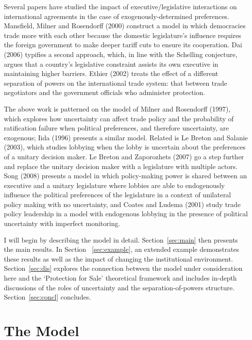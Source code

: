 \documentclass[10pt]{article}
\begin{document}
Several papers have studied the impact of executive/legislative interactions on international agreements in the case of exogenously-determined preferences. Mansfield, Milner and Rosendorff (2000) construct a model in which democracies trade more with each other because the domestic legislature's influence requires the foreign government to make deeper tariff cuts to ensure its cooperation. Dai (2006) typifies a second approach, which, in line with the Schelling conjecture, argues that a country's legislative constraint assists its own executive in maintaining higher barriers. Ethier (2002) treats the effect of a different separation of powers on the international trade system: that between trade negotiators and the government officials who administer protection.

The above work is patterned on the model of Milner and Rosendorff (1997), which explores how uncertainty can affect trade policy and the probability of ratification failure when political preferences, and therefore uncertainty, are exogenous;  Iida (1996) presents a similar model. Related is Le Breton and Salanie (2003), which studies lobbying when the lobby is uncertain about the preferences of a unitary decision maker. Le Breton and Zaporozhets (2007) go a step further and replace the unitary decision maker with a legislature with multiple actors. Song (2008) presents a model in which policy-making power is shared between an executive and a unitary legislature where lobbies are able to endogenously influence the political preferences of the legislature in a context of unilateral policy making with no uncertainty, and Coates and Ludema (2001) study trade policy leadership in a model with endogenous lobbying in the presence of political uncertainty with imperfect monitoring.

I will begin by describing the model in detail. Section~\ref{sec:main} then presents the main results. In Section~ \ref{sec:example}, an extended example demonstrates these results as well as the impact of changing the institutional environment. Section~\ref{sec:dis} explores the connection between the model under consideration here and the `Protection for Sale' theoretical framework and includes in-depth discussions of the roles of uncertainty and the separation-of-powers structure. Section~\ref{sec:concl} concludes.


\section{The Model}
\label{sec:model}
\end{document}
